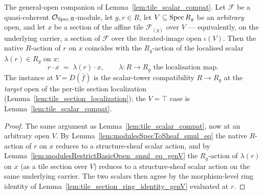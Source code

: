 \begin{lemma}\leanok
  \label{lem:tile_scalar_compat_genV}
  The general-open companion of Lemma~\ref{lem:tile_scalar_compat}. Let \(\mathcal{F}\) be a
  quasi-coherent \(\mathcal{O}_{\operatorname{Spec} R}\)-module, let \(g, r \in R\), let \(V \subseteq \operatorname{Spec} R_g\) be
  an \emph{arbitrary} open, and let \(x\) be a section of the affine tile \(\mathcal{F}_{(g)}\) over
  \(V\) --- equivalently, on the underlying carrier, a section of \(\mathcal{F}\) over the
  iterated-image open \(\iota(V)\). Then the native \(R\)-action of \(r\) on \(x\) coincides with the
  \(R_g\)-action of the localised scalar \(\lambda(r) \in R_g\) on \(x\):
  \[
    r \cdot x \;=\; \lambda(r) \cdot x,
    \qquad \lambda : R \to R_g \text{ the localisation map}.
  \]
  The instance at \(V = D(\bar f)\) is the scalar-tower compatibility \(R \to R_g\) at the \emph{target}
  open of the per-tile section localization (Lemma~\ref{lem:tile_section_localization}); the
  \(V = \top\) case is Lemma~\ref{lem:tile_scalar_compat}.
\end{lemma}
\begin{proof}
    \leanok
  The same argument as Lemma~\ref{lem:tile_scalar_compat}, now at an arbitrary open \(V\). By
  Lemma~\ref{lem:modulesSpecToSheaf_smul_eq} the native \(R\)-action of \(r\) on \(x\) reduces to a
  structure-sheaf scalar action, and by Lemma~\ref{lem:modulesRestrictBasicOpen_smul_eq_genV} the
  \(R_g\)-action of \(\lambda(r)\) on \(x\) (as a tile section over \(V\)) reduces to a structure-sheaf
  scalar action on the same underlying carrier. The two scalars then agree by the morphism-level ring
  identity of Lemma~\ref{lem:tile_section_ring_identity_genV} evaluated at \(r\).
\end{proof}

